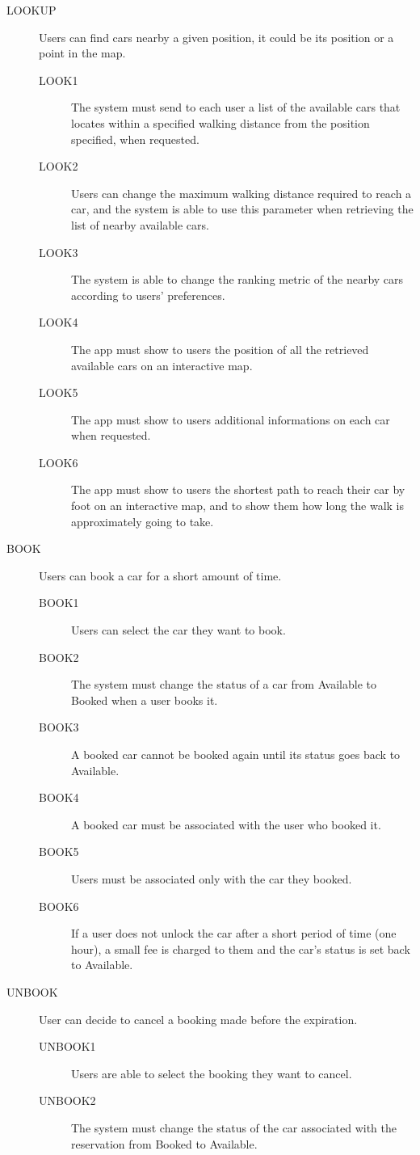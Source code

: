 \documentclass[11pt]{article} %
\begin{document}
\begin{description}
 	\item[LOOKUP] Users can find cars nearby a given position, it could be its position or a point in the map.
	\begin{description}
	\item[LOOK1] The system must send to each user a list of the available cars that locates within a specified walking distance from the position specified, when requested.
	\item[LOOK2] Users can change the maximum walking distance required to reach a car, and the system is able to use this parameter when retrieving the list of nearby available cars.
	\item[LOOK3] The system is able to change the ranking metric of the nearby cars according to users' preferences.
	\item[LOOK4] The app must show to users the position of all the retrieved available cars on an interactive map.
	\item[LOOK5] The app must show to users additional informations on each car when requested.
	\item[LOOK6] The app must show to users the shortest path to reach their car by foot on an interactive map, and to show them how long the walk is approximately going to take.
	\end{description}

 	\item[BOOK] Users can book a car for a short amount of time.
	\begin{description}
	\item[BOOK1] Users can select the car they want to book.
	\item[BOOK2] The system must change the status of a car from Available to Booked when a user books it.
	\item[BOOK3] A booked car cannot be booked again until its status goes back to Available.
	\item[BOOK4] A booked car must be associated with the user who booked it.
	\item[BOOK5] Users must be associated only with the car they booked.
	\item[BOOK6] If a user does not unlock the car after a short period of time (one hour), a small fee is charged to them and the car's status is set back to Available.
	\end{description}

	\item[UNBOOK] User can decide to cancel a booking made before the expiration.
	\begin{description}
	\item[UNBOOK1] Users are able to select the booking they want to cancel.
	\item[UNBOOK2] The system must change the status of the car associated with the reservation from Booked to Available.
	\end{description}
	

\end{description}
\end{document}
